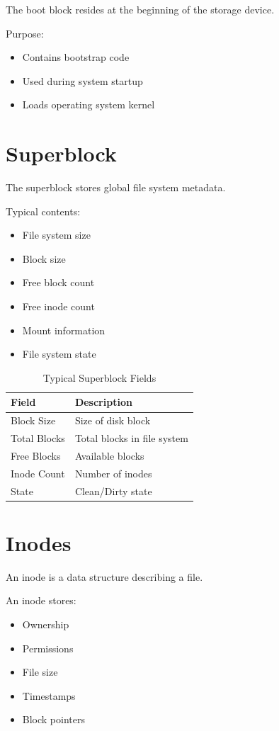 The boot block resides at the beginning of the storage device.

Purpose:

\begin{itemize}
\item Contains bootstrap code
\item Used during system startup
\item Loads operating system kernel
\end{itemize}

\section{Superblock}

The superblock stores global file system metadata.

Typical contents:

\begin{itemize}
\item File system size
\item Block size
\item Free block count
\item Free inode count
\item Mount information
\item File system state
\end{itemize}

\begin{table}[H]
\centering
\begin{tabular}{ll}
\toprule
Field & Description \\
\midrule
Block Size & Size of disk block \\
Total Blocks & Total blocks in file system \\
Free Blocks & Available blocks \\
Inode Count & Number of inodes \\
State & Clean/Dirty state \\
\bottomrule
\end{tabular}
\caption{Typical Superblock Fields}
\end{table}

\section{Inodes}

An inode is a data structure describing a file.

An inode stores:

\begin{itemize}
\item Ownership
\item Permissions
\item File size
\item Timestamps
\item Block pointers
\end{itemize}

